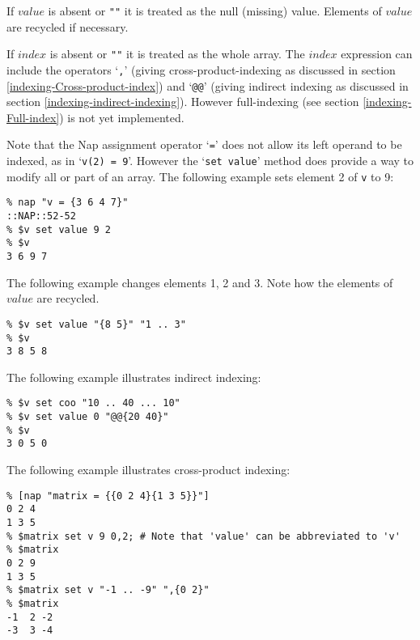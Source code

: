 If 
  $value$ is absent or 
  \texttt{""} it is treated as the null (missing) value.
  Elements of 
  $value$ are recycled if necessary.
  

If 
  $index$ is absent or 
  \texttt{""} it is treated as the whole array. 
The $index$ expression can include the operators `\texttt{,}' (giving 
{cross-product-indexing} as discussed in section \ref{indexing-Cross-product-index})
  and `\texttt{@@}' (giving 
{indirect indexing} as discussed in section \ref{indexing-indirect-indexing}).
  However {full-indexing} (see section \ref{indexing-Full-index}) is not yet implemented.
  

Note that the Nap assignment operator `\texttt{=}' does not allow its left operand to be indexed,
  as in `\texttt{v(2) = 9}'. However the `\texttt{set value}' method does provide a way to modify all
  or part of an array. The following example sets element 2 of 
  \texttt{v} to 9:
  \begin{verbatim}
% nap "v = {3 6 4 7}"
::NAP::52-52
% $v set value 9 2
% $v
3 6 9 7
\end{verbatim}

  

The following example changes elements 1, 2 and 3. Note how the
  elements of 
  $value$ are recycled.
  \begin{verbatim}
% $v set value "{8 5}" "1 .. 3"
% $v
3 8 5 8
\end{verbatim}

  

The following example illustrates indirect indexing:
  \begin{verbatim}
% $v set coo "10 .. 40 ... 10"
% $v set value 0 "@@{20 40}"
% $v
3 0 5 0
\end{verbatim}

  

The following example illustrates cross-product indexing:
  \begin{verbatim}
% [nap "matrix = {{0 2 4}{1 3 5}}"]
0 2 4
1 3 5
% $matrix set v 9 0,2; # Note that 'value' can be abbreviated to 'v'
% $matrix
0 2 9
1 3 5
% $matrix set v "-1 .. -9" ",{0 2}"
% $matrix
-1  2 -2
-3  3 -4
\end{verbatim}

